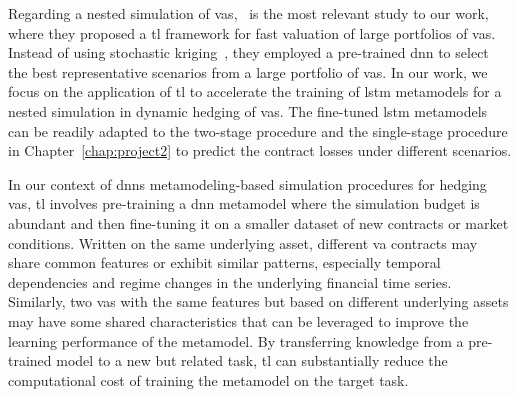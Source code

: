 Regarding a nested simulation of \gls{va}s,~\cite{cheng2019fast} is the most relevant study to our work, where they proposed a \gls{tl} framework for fast valuation of large portfolios of \gls{va}s.
Instead of using stochastic kriging~\citep{gan2015valuation}, they employed a pre-trained \gls{dnn} to select the best representative scenarios from a large portfolio of \gls{va}s.
In our work, we focus on the application of \gls{tl} to accelerate the training of \gls{lstm} metamodels for a nested simulation in dynamic hedging of \gls{va}s.
The fine-tuned \gls{lstm} metamodels can be readily adapted to the two-stage procedure and the single-stage procedure in Chapter~\ref{chap:project2} to predict the contract losses under different scenarios.

In our context of \gls{dnn}s metamodeling-based simulation procedures for hedging \gls{va}s, \gls{tl} involves pre-training a \gls{dnn} metamodel where the simulation budget is abundant and then fine-tuning it on a smaller dataset of new contracts or market conditions.
Written on the same underlying asset, different \gls{va} contracts may share common features or exhibit similar patterns, especially temporal dependencies and regime changes in the underlying financial time series.
Similarly, two \gls{va}s with the same features but based on different underlying assets may have some shared characteristics that can be leveraged to improve the learning performance of the metamodel.
By transferring knowledge from a pre-trained model to a new but related task, \gls{tl} can substantially reduce the computational cost of training the metamodel on the target task.

